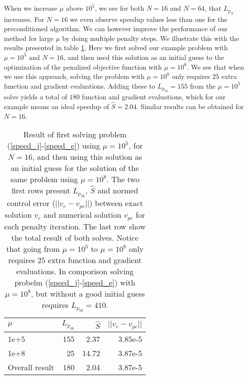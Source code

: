 \\
\\
When we increase $\mu$ above $10^5$, we see for both $N=16$ and $N=64$, that $L_{p_N}$ increases. For $N=16$ we even observe speedup values less than one for the preconditioned algorithm. We can however improve the performance of our method for large $\mu$ by doing multiple penalty steps. We illustrate this with the results presented in table \ref{mu4}. Here we first solved our example problem with $\mu=10^5$ and $N=16$, and then used this solution as an initial guess to the optimization of the penalized objective function with $\mu =10^8$. We see that when we use this approach, solving the problem with $\mu=10^8$ only requires $25$ extra function and gradient evaluations. Adding these to $L_{p_{16}}=155$ from the $\mu=10^5$ solve yields a total of $180$ function and gradient evaluations, which for our example means an ideal speedup of $\hat S =2.04$. Similar results can be obtained for $N=16$.
\\
\begin{table}[h!]
\caption{Result of first solving problem (\ref{speed_j}-\ref{speed_e}) using $\mu=10^5$, for $N=16$, and then using this solution as an initial guess for the solution of the same problem using $\mu=10^8$. The two first rows present $L_{p_{16}}$, $\hat S$ and normed control error ($||v_e-v_{pc}||$) between exact solution $v_e$ and numerical solution $v_{pc}$ for each penalty iteration. The last row show the total result of both solves. Notice that going from $\mu=10^5$ to $\mu=10^8$ only requires $25$ extra function and gradient evaluations. In comporison solving probelm (\ref{speed_j}-\ref{speed_e}) with $\mu=10^8$, but without a good initial guess requires $L_{p_{16}}=410$. } \label{mu4}
\begin{tabular}{lrrr}
\toprule
{} $\mu$ & $L_{p_{16}}$ & $\hat S$ & $||v_e-v_{pc}||$ \\
\midrule
1e+5 &155 &2.37 &3.85e-5\\
1e+8 &25 &14.72 &3.87e-5\\
\midrule
Overall result &180 &2.04 &3.87e-5\\
\bottomrule
\end{tabular}
\end{table}
